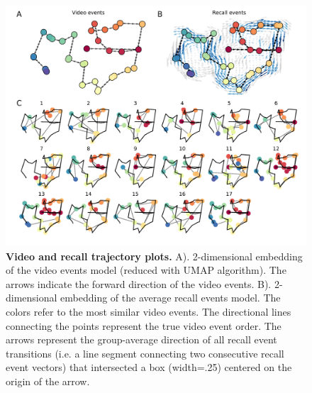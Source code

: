 \documentclass{article}
\begin{document}
{\begin{figure}[t!]
\centering
\includegraphics[width=1\textwidth]{figs/3_trajectory.pdf}
\caption{\small \textbf{Video and recall trajectory plots.} A). 2-dimensional embedding of the video events model (reduced with UMAP algorithm). The arrows indicate the forward direction of the video events. B). 2-dimensional embedding of the average recall events model.  The colors refer to the most similar video events. The directional lines connecting the points represent the true video event order. The arrows represent the group-average direction of all recall event transitions (i.e. a line segment connecting two consecutive recall event vectors) that intersected a box (width=.25) centered on the origin of the arrow.}
\label{fig:trajectory}
\end{figure}

}
\end{document}
